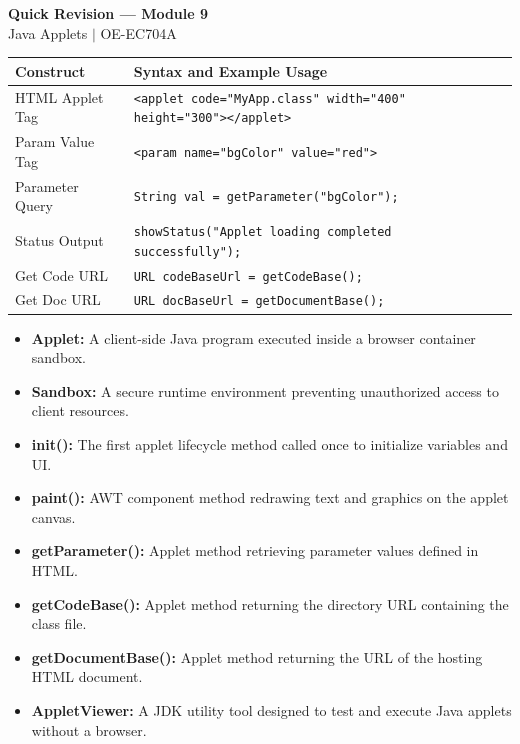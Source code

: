 \documentclass[12pt,a4paper]{article}
\renewcommand{\arraystretch}{1.45}
\begin{document}
\newpage
\begin{center}
  {\large\bfseries\color{myred} Quick Revision --- Module 9}\\[3pt]
  {\small\color{mydark} Java Applets $|$ OE-EC704A}
\end{center}
\noindent{\color{myred}\rule{\linewidth}{1.2pt}}
\vspace{4pt}

\begin{tcolorbox}[formulabox, title={\textbf{HTML Applet Tag \& Parameters}}]
{\renewcommand{\arraystretch}{1.3}%
\begin{tabularx}{\linewidth}{l Y}
\textbf{Construct} & \textbf{Syntax and Example Usage} \\
\hline
HTML Applet Tag & \texttt{<applet code="MyApp.class" width="400" height="300"></applet>} \\
Param Value Tag & \texttt{<param name="bgColor" value="red">} \\
Parameter Query & \texttt{String val = getParameter("bgColor");} \\
Status Output & \texttt{showStatus("Applet loading completed successfully");} \\
Get Code URL & \texttt{URL codeBaseUrl = getCodeBase();} \\
Get Doc URL & \texttt{URL docBaseUrl = getDocumentBase();} \\
\end{tabularx}}
\end{tcolorbox}

\begin{tcolorbox}[defbox, title={\textbf{One-Line Definitions}}]
\begin{itemize}[leftmargin=*, itemsep=2pt]
  \item \textbf{Applet:} A client-side Java program executed inside a browser container sandbox.
  \item \textbf{Sandbox:} A secure runtime environment preventing unauthorized access to client resources.
  \item \textbf{init():} The first applet lifecycle method called once to initialize variables and UI.
  \item \textbf{paint():} AWT component method redrawing text and graphics on the applet canvas.
  \item \textbf{getParameter():} Applet method retrieving parameter values defined in HTML.
  \item \textbf{getCodeBase():} Applet method returning the directory URL containing the class file.
  \item \textbf{getDocumentBase():} Applet method returning the URL of the hosting HTML document.
  \item \textbf{AppletViewer:} A JDK utility tool designed to test and execute Java applets without a browser.
\end{itemize}
\end{tcolorbox}
\end{document}
